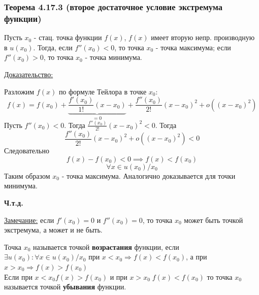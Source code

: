 \documentclass[12pt]{article}
\begin{document}
    \subsubsection*{Теорема 4.17.3 (второе достаточное условие экстремума функции)}\label{th:4.17.3}
    Пусть $x_0$ - стац. точка функции $f(x)$, $f(x)$ имеет вторую непр. производную в $u(x_0)$. Тогда, если $f''(x_0) < 0$, то точка $x_0$ - точка максимума; если $f''(x_0) > 0$, то точка $x_0$ - точка минимума.\par\noindent
    \underline{Доказательство:}
    \begin{adjustwidth}{1.5em}{1.5em}
        Разложим $f(x)$ по формуле Тейлора в точке $x_0$:
        \[ f(x) = f(x_0) + \underbrace{\frac{f'(x_0)}{1!}(x-x_0)}_{= 0} + \frac{f''(x_0)}{2!}(x-x_0)^2 + o((x-x_0)^2) \]
        Пусть $f''(x_0) < 0$. Тогда $\frac{f''(x_0)}{2!}(x-x_0)^2 < 0$. Тогда
        \[ \frac{f''(x_0)}{2!}(x-x_0)^2 + o((x-x_0)^2) < 0 \]
        Следовательно
        \[ f(x) - f(x_0) < 0 \implies f(x) < f(x_0) \]
        \[ \forall x \in u(x_0)/x_0 \]
        Таким образом $x_0$ - точка максимума.
        Аналогично доказывается для точки минимума.
        \begin{center}
            \textbf{Ч.т.д.}
        \end{center}
    \end{adjustwidth}
    \underline{Замечание:} если $f'(x_0) = 0$ и $f''(x_0) = 0$, то точка $x_0$ может быть точкой экстремума, а может и не быть.\par\noindent
    Точка $x_0$ называется точкой \textbf{возрастания} функции, если $\exists u(x_0) : \forall x \in u(x_0)/x_0$  при $x<x_0 \Rightarrow f(x)<f(x_0)$, а при $x>x_0 \Rightarrow f(x)>f(x_0)$\\
    Если при $x<x_0 f(x)>f(x_0)$ и при $x>x_0 \; f(x)<f(x_0)$ то точка $x_0$ называется точкой \textbf{убывания} функции.
\end{document}
